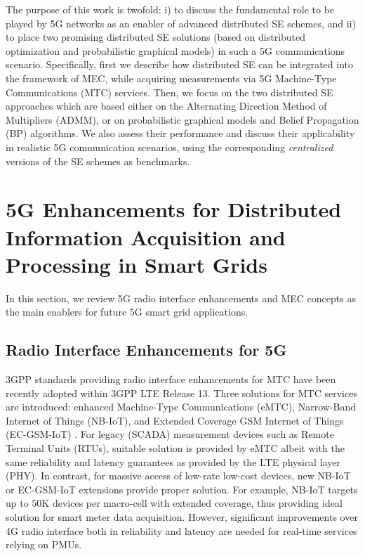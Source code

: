 \documentclass[journal]{IEEEtran}
\begin{document}
The purpose of this work is twofold: i) to discuss the fundamental role to be played by 5G networks as an enabler of advanced distributed SE schemes, and ii) to place two promising distributed SE solutions (based on distributed optimization and probabilistic graphical models) in such a 5G communications scenario. Specifically, first we describe how distributed SE can be integrated into the framework of MEC, while acquiring measurements via 5G Machine-Type Communications (MTC) services. Then, we focus on the two distributed SE approaches which are based either on the Alternating Direction Method of Multipliers (ADMM), or on probabilistic graphical models and Belief Propagation (BP) algorithms. We also assess their performance and discuss their applicability in realistic 5G communication scenarios, using the corresponding \emph{centralized} versions of the SE schemes as benchmarks.

\section{5G Enhancements for Distributed Information Acquisition and Processing in Smart Grids}

In this section, we review 5G radio interface enhancements and MEC concepts as the main enablers for future 5G smart grid applications.

\subsection{Radio Interface Enhancements for 5G}

3GPP standards providing radio interface enhancements for MTC have been recently adopted within 3GPP LTE Release 13. Three solutions for MTC services are introduced: enhanced Machine-Type Communications (eMTC), Narrow-Band Internet of Things (NB-IoT), and Extended Coverage GSM Internet of Things (EC-GSM-IoT) \cite{yavuz}. For legacy (SCADA) measurement devices such as Remote Terminal Units (RTUs), suitable solution is provided by eMTC albeit with the same reliability and latency guarantees as provided by the LTE physical layer (PHY). In contrast, for massive access of low-rate low-cost devices, new NB-IoT or EC-GSM-IoT extensions provide proper solution. For example, NB-IoT targets up to $50\mathrm{K}$ devices per macro-cell with extended coverage, thus providing ideal solution for smart meter data acquisition. However, significant improvements over 4G radio interface both in reliability and latency are needed for real-time services relying on PMUs. 
\end{document}
